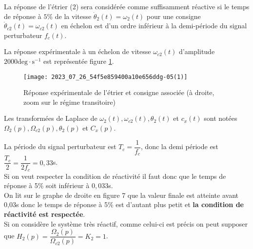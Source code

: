 La réponse de l'étrier (2) sera considérée comme suffisamment réactive si le temps de réponse à $5 \%$ de la vitesse $\dot{\theta}_{2}(t)=\omega_{2}(t)$ pour une consigne $\dot{\theta}_{c 2}(t)=\omega_{c 2}(t)$ en échelon est d'un ordre inférieur à la demi-période du signal perturbateur $f_{c}(t)$.

La réponse expérimentale à un échelon de vitesse $\omega_{c 2}(t)$ d'amplitude $2000 \mathrm{deg} \cdot \mathrm{s}^{-1}$ est représentée figure \ref{fig_ccspsi2022:07}.

\begin{figure}[!h]
\centering
\texttt{[image: 2023\_07\_26\_54f5e859400a10e656ddg-05(1)]}
\caption{\label{fig_ccspsi2022:07}Réponse expérimentale de l'étrier et consigne associée (à droite, zoom sur le régime transitoire)}
\end{figure}

Les transformées de Laplace de $\omega_{2}(t), \omega_{c 2}(t), \theta_{2}(t)$ et $c_{x}(t)$ sont notées $\Omega_{2}(p), \Omega_{c 2}(p), \theta_{2}(p)$ et $C_{x}(p)$.
\fi

\ifprof
\begin{corrige}
La période du signal perturbateur est $T_c = \dfrac{1}{f_c}$, donc la demi période est $\dfrac{T_c}{2} = \dfrac{1}{2f_c} = 0,33$s.\\

Si on veut respecter la condition de réactivité il faut donc que le temps de réponse à 5\% soit inférieur à $0,033$s.\\

On lit sur le graphe de droite en figure 7 que la valeur finale est atteinte avant 0,03s donc le temps de réponse à 5\% est d'autant plus petit et \textbf{la condition de réactivité est respectée}.\\

Si on considère le système très réactif, comme celui-ci est précis on peut supposer que $\boxed{H_2(p) = \dfrac{\Omega_2(p)}{\Omega_{c2}(p)} = K_2 = 1}$.
\end{corrige}
\else
\fi

